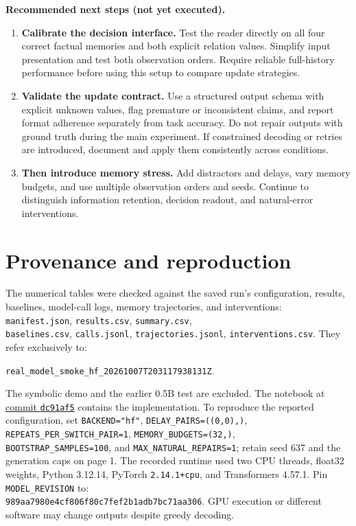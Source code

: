 \documentclass[11pt,letterpaper]{article}
\newcommand{\code}[1]{\texttt{#1}}
\begin{document}
\textbf{Recommended next steps (not yet executed).}
\begin{enumerate}
\item \textbf{Calibrate the decision interface.} Test the reader directly on all four
      correct factual memories and both explicit relation values. Simplify input
      presentation and test both observation orders. Require reliable full-history
      performance before using this setup to compare update strategies.
\item \textbf{Validate the update contract.} Use a structured output schema with
      explicit unknown values, flag premature or inconsistent claims, and report
      format adherence separately from task accuracy. Do not repair outputs with
      ground truth during the main experiment. If constrained decoding or retries
      are introduced, document and apply them consistently across conditions.
\item \textbf{Then introduce memory stress.} Add distractors and delays, vary memory
      budgets, and use multiple observation orders and seeds. Continue to distinguish
      information retention, decision readout, and natural-error interventions.
\end{enumerate}

\section*{Provenance and reproduction}
\small
The numerical tables were checked against the saved run's configuration, results,
baselines, model-call logs, memory trajectories, and interventions:
\code{manifest.json}, \code{results.csv}, \code{summary.csv},\\
\code{baselines.csv}, \code{calls.jsonl}, \code{trajectories.jsonl},
\code{interventions.csv}. They refer exclusively to:

\code{real\_model\_smoke\_hf\_20261007T203117938131Z}.

The symbolic demo and the earlier 0.5B test are excluded. The notebook at
\href{https://github.com/russellyaoduphd-cyber/520.637-HW-2/blob/dc91af59480bb7f2299e7ed5c5f3287d22cf4fda/AgentReasoning.ipynb}{commit \code{dc91af5}}
contains the implementation. To reproduce the reported configuration, set
\code{BACKEND="hf"}, \code{DELAY\_PAIRS=((0,0),)},\\
\code{REPEATS\_PER\_SWITCH\_PAIR=1}, \code{MEMORY\_BUDGETS=(32,)},\\
\code{BOOTSTRAP\_SAMPLES=100}, and \code{MAX\_NATURAL\_REPAIRS=1}; retain seed 637
and the generation caps on page 1. The recorded runtime used two CPU threads,
float32 weights, Python 3.12.14, PyTorch \code{2.14.1+cpu}, and Transformers 4.57.1.
Pin \code{MODEL\_REVISION} to:\\
\code{989aa7980e4cf806f80c7fef2b1adb7bc71aa306}.
GPU execution or different software may change outputs despite greedy decoding.
\end{document}
